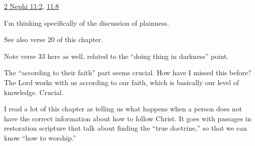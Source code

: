 \begin{compactdesc}
\begin{compactitem}
					\item \hyperref[2NEPHI-11-2]{2 Nephi 11:2}, \hyperref[2NEPHI-11-8]{11:8}
				\end{compactitem}
			\item[{\hyperref[1NEPHI-22-1]{1 Nephi 22:1--2}}]
			\item[{\hyperref[2NEPHI-2-4]{2 Nephi 2:4--5}}]
			\item[{\hyperref[2NEPHI-21-2]{2 Nephi 21:2--5}}]
			\item[{\hyperref[2NEPHI-21-9]{2 Nephi 21:9}}]
			\item[{\hyperref[2NEPHI-25-4]{2 Nephi 25:4--7}}] \phantom{.}
				\begin{compactitem}
					\item I'm thinking specifically of the discussion of plainness.
					\item See also verse 20 of this chapter.
				\end{compactitem}
			\item[{\hyperref[2NEPHI-26-1]{2 Nephi 26:1}}]
			\item[{\hyperref[2NEPHI-26-11]{2 Nephi 26:11}}]
			\item[{\hyperref[2NEPHI-26-13]{2 Nephi 26:13}}]
			\item[{\hyperref[2NEPHI-26-22]{2 Nephi 26:22--24}}] \phantom{.}
				\begin{compactitem}
					\item Note verse 33 here as well, related to the ``doing thing in darkness'' point.
				\end{compactitem}
			\item[{\hyperref[2NEPHI-27-23]{2 Nephi 27:23}}] \phantom{.}
				\begin{compactitem}
					\item The ``according to their faith'' part seems crucial. How have I missed this before? The Lord works with us according to our faith, which is basically our level of knowledge. Crucial.
				\end{compactitem}
			\item[{\hyperref[2NEPHI-28]{2 Nephi 28}}] \phantom{.}
				\begin{compactitem}
					\item I read a lot of this chapter as telling us what happens when a person does not have the correct information about how to follow Christ. It goes with passages in restoration scripture that talk about finding the ``true doctrine,'' so that we can know ``how to worship.''
				\end{compactitem}

\end{compactdesc}
